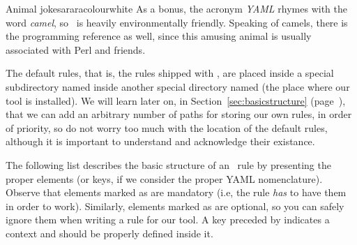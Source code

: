 \begin{messagebox}{Animal jokes}{araracolour}{\icok}{white}
As a bonus, the acronym \emph{YAML} rhymes with the word \emph{camel}, so \arara\ is heavily environmentally friendly. Speaking of camels, there is the programming reference as well, since this amusing animal is usually associated with Perl and friends.
\end{messagebox}

The default rules, that is, the rules shipped with \arara, are placed inside a special subdirectory named  inside another special directory named  (the place where our tool is installed). We will learn later on, in Section~\ref{sec:basicstructure} (page~\pageref{sec:basicstructure}), that we can add an arbitrary number of paths for storing our own rules, in order of priority, so do not worry too much with the location of the default rules, although it is important to understand and acknowledge their existance.

The following list describes the basic structure of an \arara\ rule by presenting the proper elements (or keys, if we consider the proper YAML nomenclature). Observe that elements marked as  are mandatory (i.e, the rule \emph{has} to have them in order to work). Similarly, elements marked as  are optional, so you can safely ignore them when writing a rule for our tool. A key preceded by  indicates a context and should be properly defined inside it.

